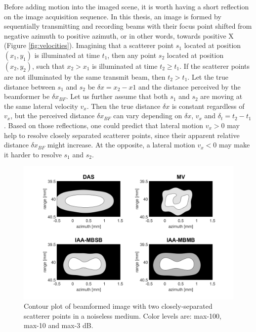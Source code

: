 Before adding motion into the imaged scene, it is worth having a short reflection on the image acquisition sequence. In this thesis, an image is formed by sequentially transmitting and recording beams with their focus point shifted from negative azimuth to positive azimuth, or in other words, towards positive X (Figure \ref{fig:velocities}). Imagining that a scatterer point $s_1$ located at position $(x_1, y_1)$ is illuminated at time $t_1$, then any point $s_2$ located at position $(x_2, y_2)$, such that $x_2 > x_1$ is illuminated at time $t_2 \geq t_1$. If the scatterer points are not illuminated by the same transmit beam, then $t_2 > t_1$.
Let the true distance between $s_1$ and $s_2$ be $\delta x = x_2 - x1$ and the distance perceived by the beamformer be $\delta x_{BF}$.
Let us further assume that both $s_1$ and $s_2$ are moving at the same lateral velocity $v_x$.
Then the true distance $\delta x$ is constant regardless of $v_x$, but the perceived distance $\delta x_{BF}$ can vary depending on $\delta x$, $v_x$ and $\delta_t = t_2 - t_1$.
Based on those reflections, one could predict that lateral motion $v_x > 0$ may help to resolve closely separated scatterer points, since their apparent relative distance $\delta x_{BF}$ might increase. At the opposite, a lateral motion $v_x < 0$ may make it harder to resolve $s_1$ and $s_2$. 


\begin{figure}[ht]
    \centering
    \includegraphics[width=\linewidth]{./images/results/2.2/motion_0_0.png}
    \caption[Contour plot of beamformed image with two closely-separated scatterer points in a noiseless medium.]{Contour plot of beamformed image with two closely-separated scatterer points in a noiseless medium. Color levels are: max-100, max-10 and max-3 dB.}
    \label{fig:two_points_static}
\end{figure}

